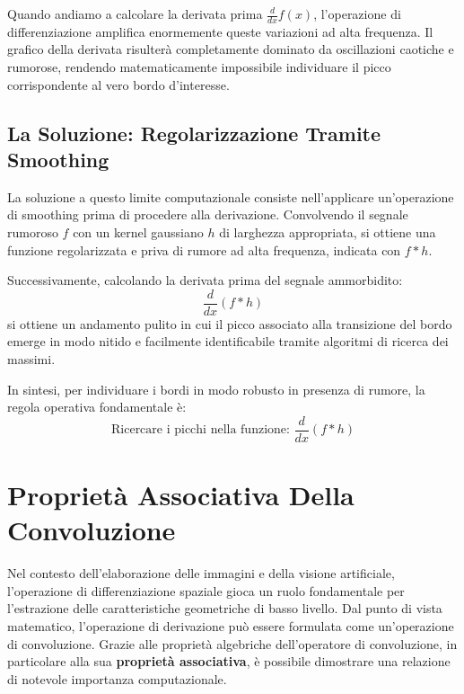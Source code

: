 ﻿\documentclass[11pt, a4paper]{article}
\begin{document}
Quando andiamo a calcolare la derivata prima $\frac{d}{dx} f(x)$, l'operazione di differenziazione amplifica enormemente queste variazioni ad alta frequenza. Il grafico della derivata risulterà completamente dominato da oscillazioni caotiche e rumorose, rendendo matematicamente impossibile individuare il picco corrispondente al vero bordo d'interesse.


\subsection{La Soluzione: Regolarizzazione Tramite Smoothing}

La soluzione a questo limite computazionale consiste nell'applicare un'operazione di smoothing prima di procedere alla derivazione. Convolvendo il segnale rumoroso $f$ con un kernel gaussiano $h$ di larghezza appropriata, si ottiene una funzione regolarizzata e priva di rumore ad alta frequenza, indicata con $f * h$.

Successivamente, calcolando la derivata prima del segnale ammorbidito:
\[ \frac{d}{dx} (f * h) \]
si ottiene un andamento pulito in cui il picco associato alla transizione del bordo emerge in modo nitido e facilmente identificabile tramite algoritmi di ricerca dei massimi.

In sintesi, per individuare i bordi in modo robusto in presenza di rumore, la regola operativa fondamentale è:
\[ \boxed{\text{Ricercare i picchi nella funzione: } \frac{d}{dx}(f * h)} \]


\section{Proprietà Associativa Della Convoluzione}

Nel contesto dell'elaborazione delle immagini e della visione artificiale, l'operazione di differenziazione spaziale gioca un ruolo fondamentale per l'estrazione delle caratteristiche geometriche di basso livello. Dal punto di vista matematico, l'operazione di derivazione può essere formulata come un'operazione di convoluzione. Grazie alle proprietà algebriche dell'operatore di convoluzione, in particolare alla sua \textbf{proprietà associativa}, è possibile dimostrare una relazione di notevole importanza computazionale.
\end{document}
